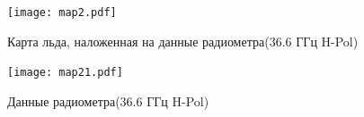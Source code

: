 \begin{figure}[h!]
  \centering
  
  \begin{minipage}{0.49\linewidth}
    \texttt{[image: map2.pdf]}
    \caption{Карта льда, наложенная на данные радиометра(36.6 ГГц H-Pol)}
    \label{fig:16}
  \end{minipage}
  \begin{minipage}{0.49\linewidth}
    \texttt{[image: map21.pdf]}
    \caption{Данные радиометра(36.6 ГГц H-Pol)}
    \label{fig:17}
  \end{minipage}

\end{figure}

